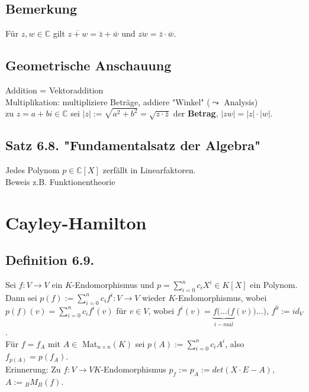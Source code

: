 \documentclass[a4paper, 12pt]{extarticle}
\begin{document}
\subsection*{Bemerkung}
Für $z, w \in \mathbb{C}$ gilt $\overline{z+w} = \bar{z}+\bar{w}$ und $\overline{zw} = \bar{z} \cdot \bar{w}$.\\
\subsection*{Geometrische Anschauung}
Addition = Vektoraddition\\
Multiplikation: multipliziere Beträge, addiere "Winkel" ($\leadsto$ Analysis)\\
zu $z = a+bi\in\mathbb{C}$ sei $|z| := \sqrt{a^2+b^2} = \sqrt{z\cdot \bar{z}}$ der \textbf{Betrag}, $|zw| = |z| \cdot |w|$.\\
\begin{figure}[h]
\end{figure}
\subsection*{Satz 6.8. "Fundamentalsatz der Algebra"}
Jedes Polynom $p\in\mathbb{C}[X]$ zerfällt in Linearfaktoren.\\
Beweis z.B. Funktionentheorie
\section*{Cayley-Hamilton}
\subsection*{Definition 6.9.}
Sei $f:V\longrightarrow V$ ein $K$-Endomorphismus und $p=\sum_{i=0}^{n}c_iX^i\in K[X]$ ein Polynom. Dann sei $p(f) := \sum_{i=0}^{n}c_if^i:V\longrightarrow V$ wieder $K$-Endomorphismus, wobei $p(f)(v) = \sum_{i=0}^{n}c_if^i(v)$ für $v\in V$, wobei $f^i(v) = \underbrace{f( \dots (f}_{i-mal}(v))\dots)$, $f^0:=id_V$.\\
Für $f=f_A$ mit $A\in$ Mat$_{n\times n}(K)$ sei $p(A) := \sum_{i=0}^{n}c_iA^i$, also $f_{p(A)} = p(f_A)$.\\
Erinnerung: Zu $f:V\longrightarrow V K$-Endomorphismus $p_f := p_A := det(X\cdot E - A)$, $A := {_B}M_B(f)$.\\
\end{document}
